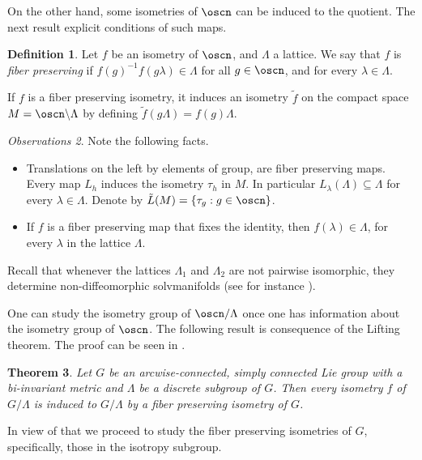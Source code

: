 \documentclass[12pt]{amsart}
\theoremstyle{plain}
\newtheorem{thm}{Theorem}[section]
\theoremstyle{definition}
\newtheorem{defn}[thm]{Definition}
\theoremstyle{remark}
\newtheorem{obs}[thm]{Observations}
\begin{document}
On the other hand, some isometries of $\oscn$ can be induced to the quotient. The next result explicit conditions of such maps. %

\begin{defn} Let $f$ be  an isometry of $\oscn$, and $\Lambda$ a lattice. We say that $f$ is {\em fiber preserving} if $f(g)^{-1} f(g\lambda) \in\Lambda$ for all $g \in \oscn$, and for every $\lambda\in \Lambda$. 
\end{defn}
		If $f$ is a fiber preserving
isometry, it induces an isometry  $\tilde{f}$ on the compact space $M=\oscn\backslash \Lambda$   by defining $\tilde{f}(g\Lambda) = f(g)\Lambda$. 


\begin{obs} Note the following facts. 
	\begin{itemize}
		\item Translations on the left by elements of group, are fiber preserving maps. Every map $L_h$ induces the isometry $\tau_h$ in $M$. In particular $L_{\lambda}(\Lambda)\subseteq \Lambda$ for every $\lambda\in \Lambda$. Denote by  $\tilde{L}(M)=\{\tau_g:g\in \oscn\}$. 
		\item If $f$ is a fiber preserving map that fixes the identity, then $f(\lambda)\in \Lambda$, for every $\lambda$ in the lattice $\Lambda$. 
	\end{itemize}
	
\end{obs}


Recall that whenever the lattices $\Lambda_1$ and $\Lambda_2$ are not pairwise isomorphic, they determine non-diffeomorphic solvmanifolds (see for instance \cite{Ra}).

One can study the isometry group of $\oscn/\Lambda$ once one has information about the isometry group of $\oscn$. The following result is consequence of the Lifting theorem. The proof can be seen in \cite{BOV}.

\begin{thm} Let $G$ be an arcwise-connected, simply connected Lie group with a bi-invariant metric and $\Lambda$ be a discrete subgroup
of $G$. Then every isometry $f$ of $G/\Lambda$ is induced to $G/\Lambda$ by a fiber preserving isometry of $G$.
\end{thm}

In view of that we proceed to study the fiber preserving isometries of $G$, specifically, those in the isotropy subgroup.  
\end{document}
